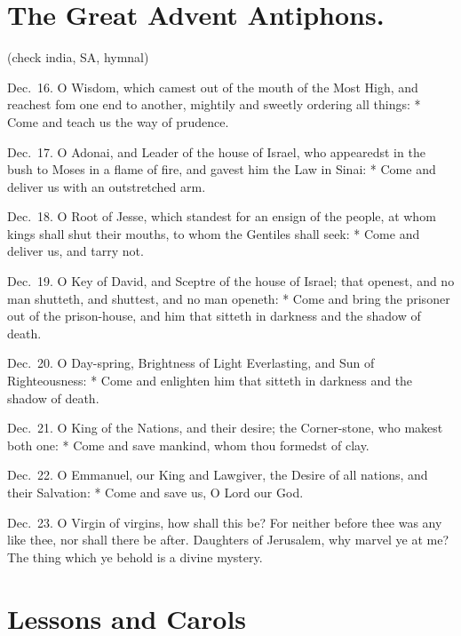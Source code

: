 \section{The Great Advent Antiphons.}
(check india, SA, hymnal)

Dec.~16.  O Wisdom, which camest out of the mouth of the Most High, and reachest fom one end to another, mightily and sweetly ordering all things: * Come and teach us the way of prudence.

Dec.~17.   O Adonai, and Leader of the house of Israel, who appearedst in the bush to Moses in a flame of fire, and gavest him the Law in Sinai: * Come and deliver us with an outstretched arm.

Dec.~18.  O Root of Jesse, which standest for an ensign of the people, at whom kings shall shut their mouths, to whom the Gentiles shall seek: * Come and deliver us, and tarry not.

Dec.~19.   O Key of David, and Sceptre of the house of Israel; that openest, and no man shutteth, and shuttest, and no man openeth: * Come and bring the prisoner out of the prison-house, and him that sitteth in darkness and the shadow of death.

Dec.~20.    O Day-spring, Brightness of Light Everlasting, and Sun of Righteousness: * Come and enlighten him that sitteth in darkness and the shadow of death.

Dec.~21.    O King of the Nations, and their desire; the Corner-stone, who makest both one: * Come and save mankind, whom thou formedst of clay.

Dec.~22.    O Emmanuel, our King and Lawgiver, the Desire of all nations, and their Salvation: * Come and save us, O Lord our God.

Dec.~23.    O Virgin of virgins, how shall this be?  For neither before thee was any like thee, nor shall there be after.  Daughters of Jerusalem, why marvel ye at me? The thing which ye behold is a divine mystery.

\medskip

\fleuron

\bigskip


\section{Lessons and Carols}

